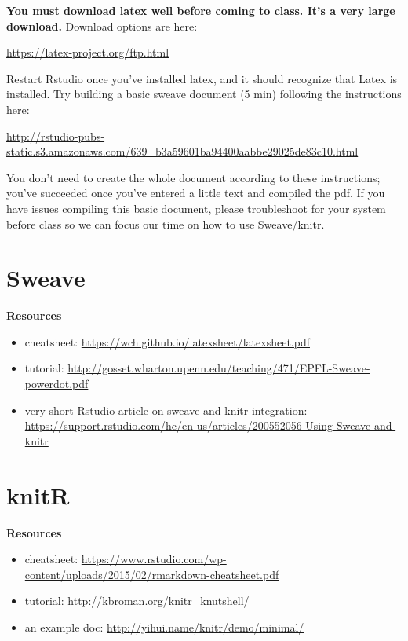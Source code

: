 \documentclass{article}
\begin{document}


\textbf{You must download latex well before coming to class. It's a very large download.} Download options are here: 

\url{https://latex-project.org/ftp.html}

Restart Rstudio once you've installed latex, and it should recognize that Latex is installed. Try building a basic sweave document (5 min) following the instructions here:

\url{http://rstudio-pubs-static.s3.amazonaws.com/639_b3a59601ba94400aabbe29025de83c10.html}

You don't need to create the whole document according to these instructions; you've succeeded once you've entered a little text and compiled the pdf. If you have issues compiling this basic document, please troubleshoot for your system before class so we can focus our time on how to use Sweave/knitr.

\section{Sweave}

\textbf{Resources}
\begin{itemize}
  \item cheatsheet: \url{https://wch.github.io/latexsheet/latexsheet.pdf}
  \item tutorial: \url{http://gosset.wharton.upenn.edu/teaching/471/EPFL-Sweave-powerdot.pdf}
  \item very short Rstudio article on sweave and knitr integration: \url{https://support.rstudio.com/hc/en-us/articles/200552056-Using-Sweave-and-knitr}
\end{itemize}


\section{knitR}

\textbf{Resources}
\begin{itemize}
  \item cheatsheet: \url{https://www.rstudio.com/wp-content/uploads/2015/02/rmarkdown-cheatsheet.pdf}
  \item tutorial: \url{http://kbroman.org/knitr_knutshell/}
  \item an example doc: \url{http://yihui.name/knitr/demo/minimal/}
\end{itemize}
\end{document}
